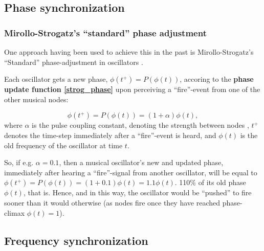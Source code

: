 	
	\subsection{Phase synchronization}
	
		\subsubsection{Mirollo-Strogatz's ``standard'' phase adjustment} %
		\label{mirollo_strogatz_phase_adjust}
		
		One approach having been used to achieve this in the past is Mirollo-Strogatz's ``Standard'' phase-adjustment in oscillators \cite{mirollo_strogatz_PCO_synch}.
		
		Each oscillator gets a new phase, $\phi(t^+) = P(\phi(t))$, accoring to the \textbf{phase update function \eqref{strog_phase}} upon perceiving a ``fire''-event from one of the other musical nodes:
		
		\begin{equation}
		\label{strog_phase}
			\phi(t^+) = P(\phi(t)) = (1 + \alpha)\phi(t) ,
		\end{equation} \nl
		where $\alpha$ is the pulse coupling constant, denoting the strength between nodes \cite{nymoen_synch}, $t^+$ denotes the time-step immediately after a ``fire''-event is heard, and $\phi(t)$ is the old frequency of the oscillator at time $t$. 
		
		So, if e.g. $\alpha = 0.1$, then a musical oscillator's new and updated phase, immediately after hearing a ``fire''-signal from another oscillator, will be equal to $\phi(t^+) = P(\phi(t)) = (1 + 0.1)\phi(t) = 1.1\phi(t)$. 110\% of its old phase $\phi(t)$, that is. Hence, and in this way, the oscillator would be ``pushed'' to fire sooner than it would otherwise (as nodes fire once they have reached phase-climax $\phi(t)=1$).
	
	
	\subsection{Frequency synchronization}
	
	
		
	
	
